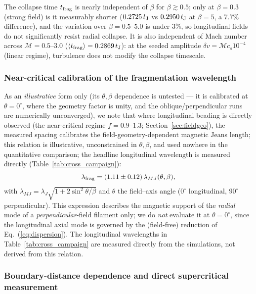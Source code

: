 \documentclass[usenatbib,twoside,twocolumn]{mnras}
\begin{document}
The collapse time $t_{\rm frag}$ is nearly independent of $\beta$ for $\beta \gtrsim 0.5$; only at $\beta = 0.3$ (strong field) is it measurably shorter ($0.2725\,t_{\rm J}$ vs $0.2950\,t_{\rm J}$ at $\beta = 5$, a 7.7\% difference), and the variation over $\beta = 0.5$--$5.0$ is under 3\%, so longitudinal fields do not significantly resist radial collapse. It is also independent of Mach number across $\mathcal{M}=0.5$--$3.0$ ($\langle t_{\rm frag}\rangle=0.2869\,t_{\rm J}$): at the seeded amplitude $\delta v=\mathcal{M}c_s10^{-4}$ (linear regime), turbulence does not modify the collapse timescale.




\subsubsection{Near-critical calibration of the fragmentation wavelength}

As an \emph{illustrative} form only (its $\theta,\beta$ dependence is untested --- it is calibrated at $\theta=0^\circ$, where the geometry factor is unity, and the oblique/perpendicular runs are numerically unconverged), we note that where longitudinal beading is directly observed (the near-critical regime $f=0.9$--$1.3$; Section~\ref{sec:fieldgeo}), the measured spacing calibrates the field-geometry-dependent magnetic Jeans length; this relation is illustrative, unconstrained in $\theta,\beta$, and used nowhere in the quantitative comparison; the headline longitudinal wavelength is measured directly (Table~\ref{tab:cross_campaign}):
\begin{equation}
\lambda_{\rm frag} = (1.11 \pm 0.12)\,\lambda_{MJ}(\theta, \beta),
\label{eq:calib}
\end{equation}
with $\lambda_{MJ}=\lambda_J\sqrt{1+2\sin^2\theta/\beta}$ \citep{Nakamura1993} and $\theta$ the field--axis angle ($0^\circ$ longitudinal, $90^\circ$ perpendicular). This expression describes the magnetic support of the \emph{radial} mode of a \emph{perpendicular}-field filament only; we do \emph{not} evaluate it at $\theta=0^\circ$, since the longitudinal axial mode is governed by the (field-free) reduction of Eq.~(\ref{eq:dispersion}). The longitudinal wavelengths in Table~\ref{tab:cross_campaign} are measured directly from the simulations, not derived from this relation.


\subsubsection{Boundary-distance dependence and direct supercritical measurement}
\label{sec:modecompetition}
\end{document}
